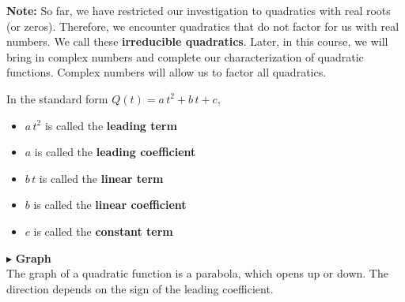 \documentclass{ximera}
\begin{document}
\textbf{Note:} So far, we have restricted our investigation to quadratics with real roots (or zeros).  Therefore, we encounter quadratics that do not factor for us with real numbers. We call these \textbf{irreducible quadratics}.  Later, in this course, we will bring in complex numbers and complete our characterization of quadratic functions. Complex numbers will allow us to factor all quadratics.




\begin{notation} 

In the standard form $Q(t) = a \, t^2 + b \, t + c  $,


\begin{itemize}
\item $a \, t^2$ is called the \textbf{leading term}
\item $a$ is called the \textbf{leading coefficient}
\item $b \, t$ is called the \textbf{linear term}
\item $b$ is called the \textbf{linear coefficient}
\item $c$ is called the \textbf{constant term}
\end{itemize}





\end{notation}





$\blacktriangleright$ \textbf{\textcolor{red!10!blue!90!}{Graph}} \\ 

The graph of a quadratic function is a parabola, which opens up or down.  The direction depends on the sign of the leading coefficient.
\end{document}
